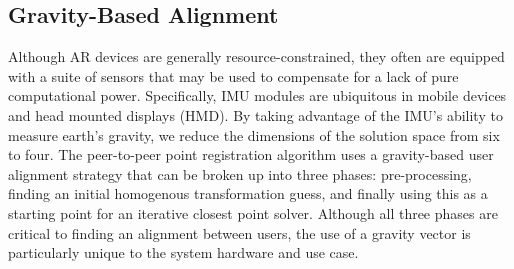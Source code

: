 \documentclass{vgtc}                          %
\begin{document}


\subsection{Gravity-Based Alignment}


Although AR devices are generally resource-constrained, they often are equipped with a suite of sensors that may be used 
to compensate for a lack of pure computational power. Specifically, IMU modules are ubiquitous in mobile devices and head mounted displays (HMD). By taking 
advantage of the IMU's ability to measure earth's gravity, we reduce the dimensions of the solution space from six to four. 
The peer-to-peer point registration algorithm uses a gravity-based user alignment strategy that can be broken up into three phases:
pre-processing, finding an initial homogenous transformation guess, and finally using this as a starting point for an iterative closest point 
solver. Although all three phases are critical to finding an alignment between users, the use of a gravity vector is particularly unique 
to the system hardware and use case. 
\end{document}
